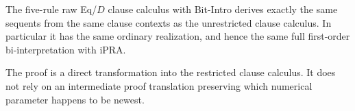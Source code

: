 \begin{theorem}
The five-rule raw Eq/$D$ clause calculus with Bit-Intro derives
exactly the same sequents from the same clause contexts as the
unrestricted clause calculus.  In particular it has the same
ordinary realization, and hence the same full first-order
bi-interpretation with iPRA.
\end{theorem}

The proof is a direct transformation into the restricted clause
calculus.  It does not rely on an intermediate proof translation
preserving which numerical parameter happens to be newest.
